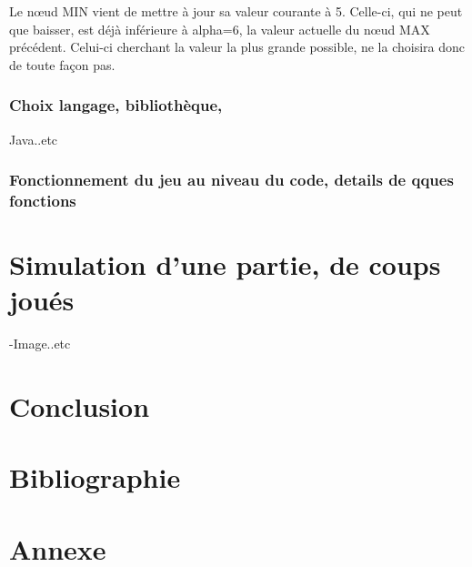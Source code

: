 \documentclass[a4]{article}
\begin{document}
	
Le nœud MIN vient de mettre à jour sa valeur courante à 5. Celle-ci, qui ne peut que baisser, 
est déjà inférieure à alpha=6, la valeur actuelle du nœud MAX précédent. Celui-ci cherchant la valeur la plus grande possible,
 ne la choisira donc de toute façon pas.	
										
										
					\subsubsection{Choix langage, bibliothèque,}	
					   Java..etc
					\subsubsection{Fonctionnement du jeu au niveau du code, details de qques fonctions}

	\section{Simulation d'une partie, de coups joués}
	-Image..etc
	
	\section{Conclusion}
	
	\section{Bibliographie}
		

	\section{Annexe}

	
\end{document}
